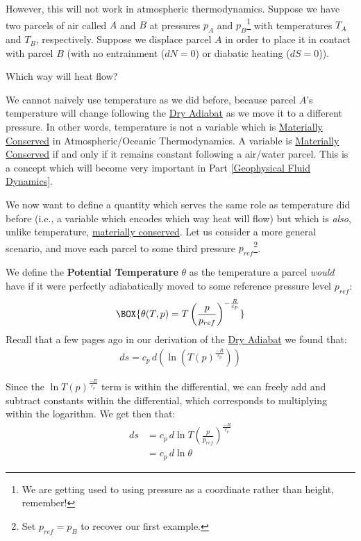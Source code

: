 However, this will not work in atmospheric thermodynamics. Suppose we have two parcels of air called $A$ and $B$ at pressures $p_A$ and $p_B$\footnote{We are getting used to using pressure as a coordinate rather than height, remember!} with temperatures $T_A$ and $T_B$, respectively. Suppose we displace parcel $A$ in order to place it in contact with parcel $B$ (with no entrainment ($dN=0$) or diabatic heating ($dS=0$)).\newline

Which way will heat flow?\newline

We cannot naively use temperature as we did before, because parcel $A$'s temperature will change following the \hyperref[Dry Adiabat]{Dry Adiabat} as we move it to a different pressure. In other words, temperature is not a variable which is \hyperref[Material Conservation]{Materially Conserved} in Atmospheric/Oceanic Thermodynamics. A variable is \hyperref[Material Conservation]{Materially Conserved} if and only if it remains constant following a air/water parcel. This is a concept which will become very important in Part \ref{Geophysical Fluid Dynamics}.

We now want to define a quantity which serves the same role as temperature did before (i.e., a variable which encodes which way heat will flow) but which is \textit{also}, unlike temperature, \hyperref[Material Conservation]{materially conserved}. Let us consider a more general scenario, and move each parcel to some third pressure $p_{ref}$\footnote{Set $p_{ref}=p_B$ to recover our first example.}. 

We define the \textbf{Potential Temperature} $\theta$ as the temperature a parcel \textit{would} have if it were perfectly adiabatically moved to some reference pressure level $p_{ref}$:
\begin{align}\label{Potential Temperature}
    \BOX{\theta(T,p)=T\left(\frac{p}{p_{ref}}\right)^{-\frac{R}{c_p}}}
\end{align}
Recall that a few pages ago in our derivation of the \hyperref[Dry Adiabat]{Dry Adiabat} we found that:
\begin{align}
    ds=c_p\,d\left(\ln \left(T(p)^\frac{-R}{c_p}\right)\right)
\end{align}

Since the $\ln T(p)^\frac{-R}{c_p}$ term is within the differential, we can freely add and subtract constants within the differential, which corresponds to multiplying within the logarithm. We get then that:
\begin{align}
    ds&=c_p\,d\ln T\left(\frac{p}{p_{ref}}\right)^\frac{-R}{c_p}
    \\
    &=c_p\,d\ln\theta
\end{align}

